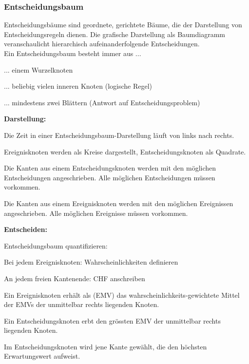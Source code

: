 \subsubsection{Entscheidungsbaum}
Entscheidungsbäume sind geordnete, gerichtete Bäume, die der Darstellung von Entscheidungsregeln dienen. Die grafische Darstellung
als Baumdiagramm veranschaulicht hierarchisch aufeinanderfolgende Entscheidungen. \\
Ein Entscheidungsbaum besteht immer aus ...
\begin{compactitem}
	\item ... einem Wurzelknoten
	\item ... beliebig vielen inneren Knoten (logische Regel)
	\item ... mindestens zwei Blättern (Antwort auf Entscheidungsproblem)
\end{compactitem}
\textbf{Darstellung:}
\begin{compactenum}
	\item Die Zeit in einer Entscheidungsbaum-Darstellung läuft von	links nach rechts.
	\item Ereignisknoten werden als Kreise dargestellt,	Entscheidungsknoten als Quadrate.
	\item Die Kanten aus einem Entscheidungsknoten werden mit den	möglichen Entscheidungen angeschrieben. Alle möglichen Entscheidungen müssen vorkommen.
	\item  Die Kanten aus einem Ereignisknoten werden mit den möglichen	Ereignissen angeschrieben. Alle möglichen Ereignisse müssen
	vorkommen.
\end{compactenum}
\textbf{Entscheiden:}
\begin{compactenum}
	\item Entscheidungsbaum quantifizieren:
	\begin{compactitem}
		\item Bei jedem Ereignisknoten: Wahrscheinlichkeiten definieren
		\item An jedem freien Kantenende: CHF anschreiben
		\item Ein Ereignisknoten erhält als  (EMV) das wahrscheinlichkeits-gewichtete Mittel der EMVs der unmittelbar rechts liegenden Knoten.
		\item Ein Entscheidungsknoten erbt den grössten EMV der unmittelbar rechts liegenden Knoten.
	\end{compactitem}
	\item Im Entscheidungsknoten wird jene Kante gewählt, die den höchsten Erwartungswert aufweist.
\end{compactenum}
